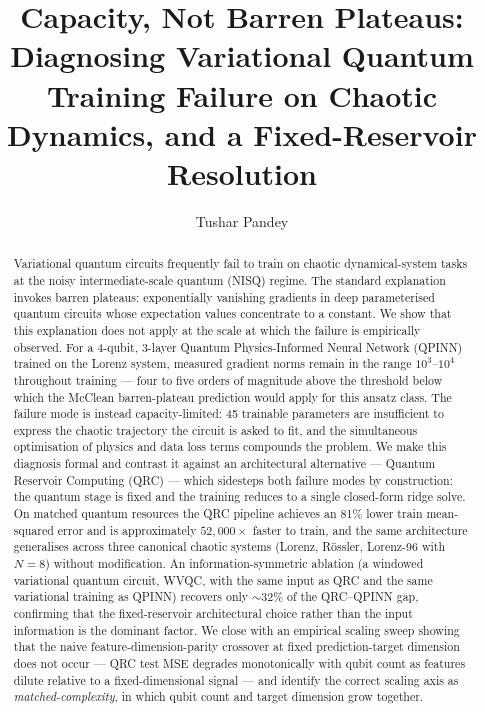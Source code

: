 \documentclass[a4paper,12pt]{iopart}
\begin{document}
\title[Capacity, not barren plateaus]
      {Capacity, Not Barren Plateaus: Diagnosing Variational Quantum
       Training Failure on Chaotic Dynamics, and a Fixed-Reservoir
       Resolution}

\author{Tushar Pandey}

\address{Texas A\&M University, College Station, TX, USA}


\submitto{\QST}

\begin{abstract}
Variational quantum circuits frequently fail to train on chaotic
dynamical-system tasks at the noisy intermediate-scale quantum (NISQ)
regime. The standard explanation invokes barren plateaus: exponentially
vanishing gradients in deep parameterised quantum circuits whose
expectation values concentrate to a constant. We show that this
explanation does not apply at the scale at which the failure is
empirically observed.
For a 4-qubit, 3-layer Quantum Physics-Informed Neural Network
(QPINN) trained on the Lorenz system, measured gradient norms remain
in the range $10^3$--$10^4$ throughout training --- four to five orders
of magnitude above the threshold below which the McClean barren-plateau
prediction would apply for this ansatz class. The failure mode is
instead capacity-limited: 45 trainable parameters are insufficient to
express the chaotic trajectory the circuit is asked to fit, and the
simultaneous optimisation of physics and data loss terms compounds the
problem. We make this diagnosis formal and contrast it against an
architectural alternative --- Quantum Reservoir Computing (QRC) ---
which sidesteps both failure modes by construction: the quantum stage
is fixed and the training reduces to a single closed-form ridge solve.
On matched quantum resources the QRC pipeline achieves an 81\% lower
train mean-squared error and is approximately $52{,}000\times$ faster
to train, and the same architecture generalises across three canonical
chaotic systems (Lorenz, R\"{o}ssler, Lorenz-96 with $N=8$) without
modification. An information-symmetric ablation (a windowed
variational quantum circuit, WVQC, with the same input as QRC and the
same variational training as QPINN) recovers only $\sim 32\%$ of the
QRC--QPINN gap, confirming that the fixed-reservoir architectural
choice rather than the input information is the dominant factor. We
close with an empirical scaling sweep showing that the naive
feature-dimension-parity crossover at fixed prediction-target
dimension does not occur --- QRC test MSE degrades monotonically with
qubit count as features dilute relative to a fixed-dimensional signal
--- and identify the correct scaling axis as
\emph{matched-complexity}, in which qubit count and target dimension
grow together.
\end{abstract}
\end{document}

